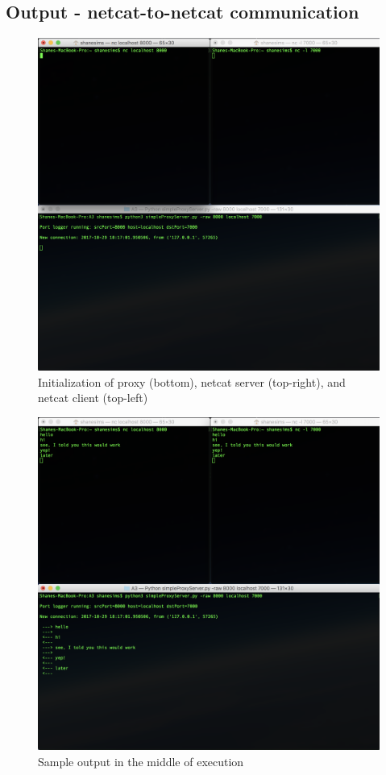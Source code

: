 \documentclass[11pt]{article}
\begin{document}
	\subsection{Output - netcat-to-netcat communication}
	\begin{figure}[H]
	\includegraphics[scale=0.5, trim={0cm 0cm 0cm 0cm}, clip]{ncncinit}
	\caption{Initialization of proxy (bottom), netcat server (top-right), and netcat client (top-left)}
	\end{figure}
	\begin{figure}[H]
	\includegraphics[scale=0.5, trim={0cm 0cm 0cm 0cm}, clip]{ncncmid}
	\caption{Sample output in the middle of execution}
	\end{figure}
	
\end{document}
